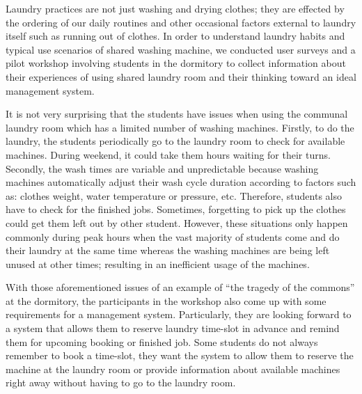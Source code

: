 Laundry practices are not just washing and drying clothes; they are effected by the ordering of
our daily routines \cite{shove2010beyond} and other occasional factors external to laundry itself such as running out of clothes. In order to understand laundry habits and typical use scenarios of shared washing machine, we conducted user surveys and a pilot workshop involving students in the dormitory to collect information about their experiences of using shared laundry room and their thinking toward an ideal management system.

It is not very surprising that the students have issues when using the communal laundry room which has a limited number of washing machines. Firstly, to do the laundry, the students periodically go to the laundry room to check for available machines. During weekend, it could take them hours waiting for their turns. Secondly, the wash times are variable and unpredictable because washing machines automatically adjust their wash cycle duration according to factors such as: clothes weight, water temperature or pressure, etc. Therefore, students also have to check for the finished jobs. Sometimes, forgetting to pick up the clothes could get them left out by other student. However, these situations only happen commonly during peak hours when the vast majority of students come and do their laundry at the same time whereas the washing machines are being left unused at other times; resulting in an inefficient usage of the machines.

With those aforementioned issues of an example of ``the tragedy of the commons'' at the dormitory, the participants in the workshop also come up with some requirements for a management system. Particularly, they are looking forward to a system that allows them to reserve laundry time-slot in advance and remind them for upcoming booking or finished job. Some students do not always remember to book a time-slot, they want the system to allow them to reserve the machine at the laundry room or provide information about available machines right away without having to go to the laundry room.